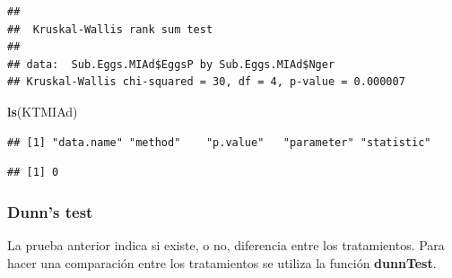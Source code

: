 \documentclass[]{article}
\newenvironment{Shaded}{\begin{snugshade}}{\end{snugshade}}
\newcommand{\CommentTok}[1]{\textcolor[rgb]{0.56,0.35,0.01}{\textit{#1}}}
\newcommand{\DataTypeTok}[1]{\textcolor[rgb]{0.13,0.29,0.53}{#1}}
\newcommand{\KeywordTok}[1]{\textcolor[rgb]{0.13,0.29,0.53}{\textbf{#1}}}
\newcommand{\NormalTok}[1]{#1}
\newcommand{\OperatorTok}[1]{\textcolor[rgb]{0.81,0.36,0.00}{\textbf{#1}}}
\newcommand{\StringTok}[1]{\textcolor[rgb]{0.31,0.60,0.02}{#1}}
\begin{document}
\begin{Shaded}
\end{Shaded}

\begin{verbatim}
## 
##  Kruskal-Wallis rank sum test
## 
## data:  Sub.Eggs.MIAd$EggsP by Sub.Eggs.MIAd$Nger
## Kruskal-Wallis chi-squared = 30, df = 4, p-value = 0.000007
\end{verbatim}

\begin{Shaded}
\begin{Highlighting}[]
\KeywordTok{ls}\NormalTok{(KTMIAd)}
\end{Highlighting}
\end{Shaded}

\begin{verbatim}
## [1] "data.name" "method"    "p.value"   "parameter" "statistic"
\end{verbatim}

\begin{Shaded}
\end{Shaded}

\begin{verbatim}
## [1] 0
\end{verbatim}

\hypertarget{dunns-test}{%
\subsubsection{Dunn's test}\label{dunns-test}}

La prueba anterior indica si existe, o no, diferencia entre los
tratamientos. Para hacer una comparación entre los tratamientos se
utiliza la función \textbf{dunnTest}.

\begin{Shaded}
\end{Shaded}
\end{document}
